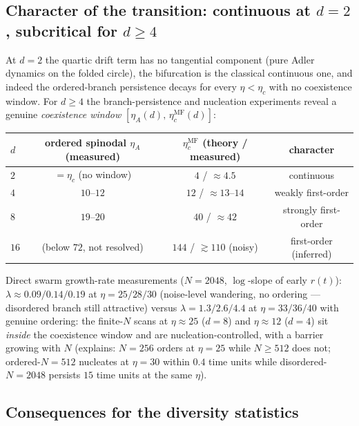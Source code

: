 \documentclass[11pt]{article}
\theoremstyle{definition}
\begin{document}
\subsection{Character of the transition: continuous at $d=2$, subcritical for $d\ge4$}

At $d=2$ the quartic drift term has no tangential component (pure Adler dynamics on
the folded circle), the bifurcation is the classical continuous one, and indeed the
ordered-branch persistence decays for every $\eta<\eta_c$ with no coexistence window.
For $d\ge4$ the branch-persistence and nucleation experiments reveal a genuine
\emph{coexistence window} $[\eta_A(d),\,\eta_c^{\mathrm{MF}}(d)]$:

\begin{center}
\begin{tabular}{lccc}
\hline
$d$ & ordered spinodal $\eta_A$ (measured) & $\eta_c^{\mathrm{MF}}$ (theory / measured) & character\\
\hline
$2$ & $=\eta_c$ (no window)        & $4$ / $\approx4.5$ & continuous\\
$4$ & $10$--$12$                   & $12$ / $\approx13$--$14$ & weakly first-order\\
$8$ & $19$--$20$                   & $40$ / $\approx42$ & strongly first-order\\
$16$& (below $72$, not resolved)   & $144$ / $\gtrsim110$ (noisy) & first-order (inferred)\\
\hline
\end{tabular}
\end{center}

Direct swarm growth-rate measurements ($N=2048$, $\log$-slope of early $r(t)$):
$\lambda\approx0.09/0.14/0.19$ at $\eta=25/28/30$ (noise-level wandering, no
ordering --- disordered branch still attractive) versus
$\lambda=1.3/2.6/4.4$ at $\eta=33/36/40$ with genuine ordering:
the finite-$N$ scans at $\eta\approx25$ ($d=8$) and $\eta\approx12$ ($d=4$)
sit \emph{inside} the coexistence window and are nucleation-controlled, with a
barrier growing with $N$ (explains: $N=256$ orders at $\eta=25$ while $N\ge512$
does not; ordered-$N=512$ nucleates at $\eta=30$ within $0.4$ time units while
disordered-$N=2048$ persists $15$ time units at the same $\eta$).

\subsection{Consequences for the diversity statistics}
\end{document}
